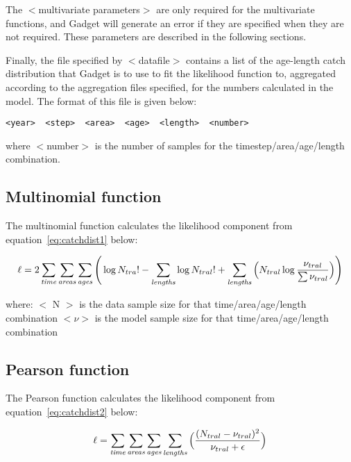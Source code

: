 \documentclass [a4paper, 10pt]{book}
\begin{document}
\bigskip
The $<$multivariate parameters$>$ are only required for the multivariate functions, and Gadget will generate an error if they are specified when they are not required.  These parameters are described in the following sections.

\bigskip
Finally, the file specified by $<$datafile$>$ contains a list of the age-length catch distribution that Gadget is to use to fit the likelihood function to, aggregated according to the aggregation files specified, for the numbers calculated in the model.  The format of this file is given below:

{\small\begin{verbatim}
<year>  <step>  <area>  <age>  <length>  <number>
\end{verbatim}}

where $<$number$>$ is the number of samples for the timestep/area/age/length combination.

\subsection{Multinomial function}
The multinomial function calculates the likelihood component from equation~\ref{eq:catchdist1} below:

\begin{equation}\label{eq:catchdist1}
\ell = 2 \sum_{\it time}\sum_{\it areas}\sum_{\it ages} \Bigg( \log N_{tra}! - \sum_{\it lengths} \log N_{tral}! + \sum_{\it lengths} \Big( N_{tral} \log {\frac{\nu_{tral}}{\sum \nu_{tral}}} \Big)\Bigg)
\end{equation}

where:\newline
$<$ N $>$ is the data sample size for that time/area/age/length combination\newline
$<\nu>$ is the model sample size for that time/area/age/length combination

\subsection{Pearson function}
The Pearson function calculates the likelihood component from equation~\ref{eq:catchdist2} below:

\begin{equation}\label{eq:catchdist2}
\ell = \sum_{\it time}\sum_{\it areas}\sum_{\it ages}\sum_{\it lengths}\Big( {\frac{ ( N_{tral} - \nu_{tral} ) ^2} {\nu_{tral} + \epsilon}} \Big)
\end{equation}
\end{document}
